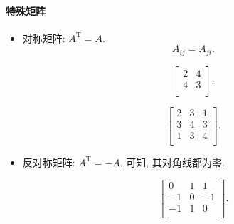 \paragraph{特殊矩阵}
\begin{itemize}
    \item 对称矩阵: $A^{\mathrm{T}}=A$.
    \begin{equation}
      A_{ij}=A_{ji}.
    \end{equation}
    \begin{example}
        \begin{equation}
          \begin{bmatrix}
           2 & 4\\
           4 & 3\\
          \end{bmatrix}.
        \end{equation}
    \end{example}
    \begin{example}
        \begin{equation}
          \begin{bmatrix}
           2 & 3 & 1\\
           3 & 4 & 3\\
           1 & 3 & 4\\
          \end{bmatrix}.
        \end{equation}
    \end{example}

    \item 反对称矩阵: $A^{\mathrm{T}} = -A$.
    可知, 其对角线都为零.
    
    \begin{example}
        \begin{equation}
          \begin{bmatrix}
           0 & 1 & 1\\
           -1 & 0 & -1\\
           -1 & 1 & 0\\
          \end{bmatrix}.
        \end{equation}
    \end{example}
\end{itemize}


